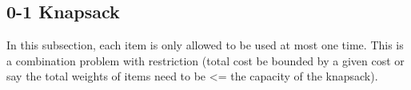 \documentclass[../main.tex]{subfiles}
\begin{document}

\subsection{0-1 Knapsack}
\label{01knapsack}
In this subsection, each item is only allowed to be used at most one time. This is a combination problem with restriction (total cost be bounded by a given cost or say the total weights of items need to be <= the capacity of the knapsack). 
\end{document}
